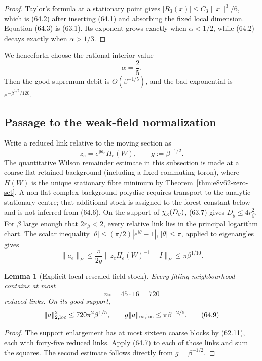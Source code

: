\documentclass[11pt,oneside]{book}
\newtheorem{lemma}[theorem]{Lemma}
\theoremstyle{definition}
\theoremstyle{remark}
\begin{document}
\begin{proof}
Taylor's formula at a stationary point gives
\(|R_3(x)|\le C_3\|x\|^3/6\), which is (64.2) after inserting
(64.1) and absorbing the fixed local dimension.  Equation (64.3)
is (63.1).  Its exponent grows exactly when \(\alpha<1/2\), while
(64.2) decays exactly when \(\alpha>1/3\).
\end{proof}

We henceforth choose the rational interior value
\[
                         \boxed{\alpha=\frac25}.             \tag{64.5}
\]
Then the good supremum debit is \(O(\beta^{-1/5})\), and the bad
exponential is \(e^{-\beta^{1/5}/120}\).

\subsection{Passage to the weak-field normalization}

Write a reduced link relative to the moving section as
\[
 z_e=e^{g a_e}H_e(W),\qquad g:=\beta^{-1/2}.                 \tag{64.6}
\]
The quantitative Wilson remainder estimate in this subsection is
made at a coarse-flat retained background (including a fixed
commuting toron), where \(H(W)\) is the unique stationary fibre
minimum by Theorem~\ref{thm:e8v62-zero-set}.  A non-flat complex
background polydisc requires transport to the analytic stationary
centre; that additional stock is assigned to the forest constant
below and is not inferred from (64.6).
On the support of \(\chi_{\rm g}(D_y)\), (63.7) gives
\(D_y\le4r_\beta^2\).  For \(\beta\) large enough that
\(2r_\beta<2\), every relative link lies in the principal
logarithm chart.  The scalar inequality
\(|\theta|\le(\pi/2)|e^{i\theta}-1|\), \(|\theta|\le\pi\),
applied to eigenangles gives
\[
 \|a_e\|_F
 \le\frac\pi{2g}\|z_eH_e(W)^{-1}-I\|_F
 \le\pi\beta^{1/10}.                                       \tag{64.7}
\]

\begin{lemma}[Explicit local rescaled-field stock]
\label{lem:e8v64-field-stock}
Every filling neighbourhood contains at most
\[
                         n_*=45\cdot16=720                  \tag{64.8}
\]
reduced links.  On its good support,
\[
 \|a\|_{2,{\rm loc}}^2
 \le720\pi^2\beta^{1/5},\qquad
 g\|a\|_{\infty,{\rm loc}}
 \le\pi\beta^{-2/5}.                                       \tag{64.9}
\]
\end{lemma}

\begin{proof}
The support enlargement has at most sixteen coarse blocks by
(62.11), each with forty-five reduced links.  Apply (64.7) to each
of those links and sum the squares.  The second estimate follows
directly from \(g=\beta^{-1/2}\).
\end{proof}
\end{document}
